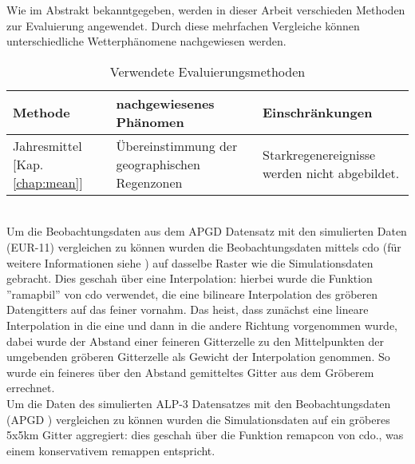 Wie im Abstrakt bekanntgegeben, werden in dieser Arbeit verschieden Methoden zur Evaluierung angewendet. Durch diese mehrfachen Vergleiche können unterschiedliche Wetterphänomene nachgewiesen werden.\\

\begin{table}[h]
	\begin{tabularx}{\textwidth}{|X|X|X|}
		\hline
		\textbf{Methode} & \textbf{nachgewiesenes Phänomen}& \textbf{Einschränkungen}\\
		\hline
		Jahresmittel [Kap. \ref{chap:mean}] & Übereinstimmung der geographischen Regenzonen & Starkregenereignisse werden nicht abgebildet.\\
		\hline
	\end{tabularx}
\caption{Verwendete Evaluierungsmethoden}
\end{table}
\hfill\\
Um die Beobachtungsdaten aus dem APGD\cite{meteoswiss} Datensatz mit den simulierten Daten (EUR-11) vergleichen zu können wurden die Beobachtungsdaten mittels cdo (für weitere Informationen siehe \cite{cdo}) auf dasselbe Raster wie die Simulationsdaten gebracht. Dies geschah über eine Interpolation: hierbei wurde die Funktion ''ramapbil'' von cdo verwendet, die eine bilineare Interpolation des gröberen Datengitters auf das feiner vornahm. Das heist, dass zunächst eine lineare Interpolation in die eine und dann in die andere Richtung vorgenommen wurde, dabei wurde der Abstand einer feineren Gitterzelle zu den Mittelpunkten der umgebenden gröberen Gitterzelle als Gewicht der Interpolation genommen. So wurde ein feineres über den Abstand gemitteltes Gitter aus dem Gröberem errechnet.\\
Um die Daten des simulierten ALP-3 Datensatzes mit den Beobachtungsdaten (APGD \cite{meteoswiss}) vergleichen zu können wurden die Simulationsdaten auf ein gröberes 5x5km Gitter aggregiert: dies geschah über die Funktion remapcon von cdo., was einem konservativem remappen entspricht. 
